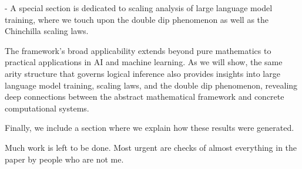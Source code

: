- A special section is dedicated to scaling analysis of large language model training, where we touch upon the double dip phenomenon as well as the Chinchilla scaling laws.

The framework's broad applicability extends beyond pure mathematics to practical applications in AI and machine learning. As we will show, the same arity structure that governs logical inference also provides insights into large language model training, scaling laws, and the double dip phenomenon, revealing deep connections between the abstract mathematical framework and concrete computational systems.

Finally, we include a section where we explain how these results were generated. 

Much work is left to be done. Most urgent are checks of almost everything in the paper by people who are not me.
